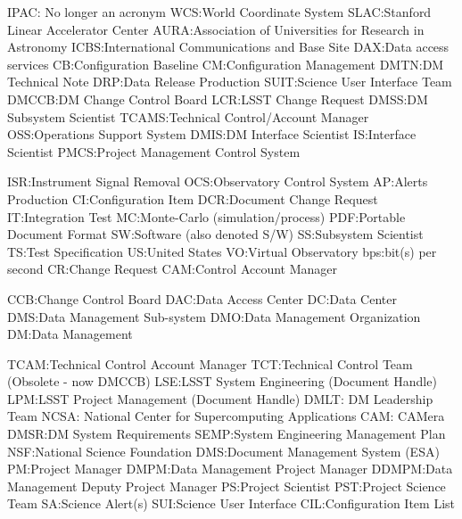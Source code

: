 IPAC: No longer an acronym
WCS:World Coordinate System
SLAC:Stanford Linear Accelerator Center
AURA:Association of Universities for Research in Astronomy
ICBS:International Communications and Base Site
DAX:Data access services
CB:Configuration Baseline
CM:Configuration Management
DMTN:DM Technical Note
DRP:Data Release Production
SUIT:Science User Interface Team
DMCCB:DM Change Control Board
LCR:LSST Change Request
DMSS:DM Subsystem Scientist
TCAMS:Technical Control/Account Manager
OSS:Operations Support System
DMIS:DM Interface Scientist
IS:Interface Scientist
PMCS:Project Management Control System

ISR:Instrument Signal Removal
OCS:Observatory Control System
AP:Alerts Production
CI:Configuration Item
DCR:Document Change Request
IT:Integration Test
MC:Monte-Carlo (simulation/process)
PDF:Portable Document Format
SW:Software (also denoted S/W)
SS:Subsystem Scientist
TS:Test Specification
US:United States
VO:Virtual Observatory
bps:bit(s) per second
CR:Change Request
CAM:Control Account Manager

CCB:Change Control Board
DAC:Data Access Center
DC:Data Center
DMS:Data Management Sub-system
DMO:Data Management Organization
DM:Data Management

TCAM:Technical Control Account Manager
TCT:Technical Control Team (Obsolete - now DMCCB)
LSE:LSST System Engineering (Document Handle)
LPM:LSST Project Management (Document Handle)
DMLT: DM Leadership Team
NCSA: National Center for Supercomputing Applications
CAM: CAMera
DMSR:DM System Requirements
SEMP:System Engineering Management Plan
NSF:National Science Foundation
DMS:Document Management System (ESA)
PM:Project Manager
DMPM:Data Management Project Manager
DDMPM:Data Management Deputy Project Manager
PS:Project Scientist
PST:Project Science Team
SA:Science Alert(s)
SUI:Science User Interface
CIL:Configuration Item List
